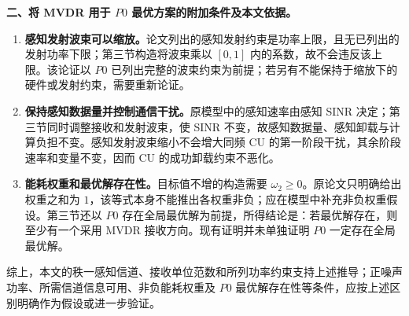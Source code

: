 \documentclass[11pt,a4paper]{ctexart}
\begin{document}
\noindent\textbf{二、将 MVDR 用于 $P0$ 最优方案的附加条件及本文依据。}
\begin{enumerate}[label=\textbf{(\arabic*)},leftmargin=*]
\item \textbf{感知发射波束可以缩放。}论文列出的感知发射约束是功率上限，且无已列出的发射功率下限；第三节构造将波束乘以 $[0,1]$ 内的系数，故不会违反该上限。该论证以 $P0$ 已列出完整的波束约束为前提；若另有不能保持于缩放下的硬件或发射约束，需要重新论证。
\item \textbf{保持感知数据量并控制通信干扰。}原模型中的感知速率由感知 SINR 决定；第三节同时调整接收和发射波束，使 SINR 不变，故感知数据量、感知卸载与计算负担不变。感知发射波束缩小不会增大同频 CU 的第一阶段干扰，其余阶段速率和变量不变，因而 CU 的成功卸载约束不恶化。
\item \textbf{能耗权重和最优解存在性。}目标值不增的构造需要 $\omega_2\ge0$。原论文只明确给出权重之和为 $1$，该等式本身不能推出各权重非负；应在模型中补充非负权重假设。第三节还以 $P0$ 存在全局最优解为前提，所得结论是：若最优解存在，则至少有一个采用 MVDR 接收方向。现有证明并未单独证明 $P0$ 一定存在全局最优解。
\end{enumerate}

综上，本文的秩一感知信道、接收单位范数和所列功率约束支持上述推导；正噪声功率、所需信道信息可用、非负能耗权重及 $P0$ 最优解存在性等条件，应按上述区别明确作为假设或进一步验证。
\end{document}
